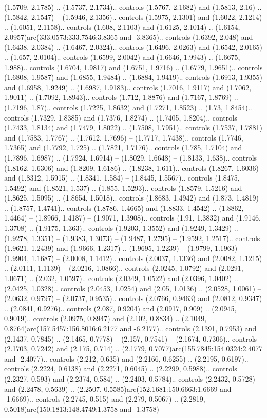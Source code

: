 (1.5709, 2.1785) .. (1.5737, 2.1734).. controls (1.5767, 2.1682) and (1.5813, 2.16) .. (1.5842, 2.1547) -- (1.5946, 2.1356).. controls (1.5975, 2.1301) and (1.6022, 2.1214) .. (1.6051, 2.1158).. controls (1.608, 2.1103) and (1.6125, 2.1014) .. (1.6154, 2.0957)arc(333.0573:333.7546:3.8365 and -3.8365).. controls (1.6392, 2.048) and (1.6438, 2.0384) .. (1.6467, 2.0324).. controls (1.6496, 2.0263) and (1.6542, 2.0165) .. (1.657, 2.0104).. controls (1.6599, 2.0042) and (1.6646, 1.9943) .. (1.6675, 1.988).. controls (1.6704, 1.9817) and (1.6751, 1.9716) .. (1.6779, 1.9651).. controls (1.6808, 1.9587) and (1.6855, 1.9484) .. (1.6884, 1.9419).. controls (1.6913, 1.9355) and (1.6958, 1.9249) .. (1.6987, 1.9183).. controls (1.7016, 1.9117) and (1.7062, 1.9011) .. (1.7092, 1.8943).. controls (1.712, 1.8876) and (1.7167, 1.8769) .. (1.7196, 1.87).. controls (1.7225, 1.8632) and (1.7271, 1.8523) .. (1.73, 1.8454).. controls (1.7329, 1.8385) and (1.7376, 1.8274) .. (1.7405, 1.8204).. controls (1.7433, 1.8134) and (1.7479, 1.8022) .. (1.7508, 1.7951).. controls (1.7537, 1.7881) and (1.7583, 1.7767) .. (1.7612, 1.7696) -- (1.7717, 1.7438).. controls (1.7746, 1.7365) and (1.7792, 1.725) .. (1.7821, 1.7176).. controls (1.785, 1.7104) and (1.7896, 1.6987) .. (1.7924, 1.6914) -- (1.8029, 1.6648) -- (1.8133, 1.638).. controls (1.8162, 1.6306) and (1.8209, 1.6186) .. (1.8238, 1.611).. controls (1.8267, 1.6036) and (1.8312, 1.5915) .. (1.8341, 1.584) -- (1.8445, 1.5567).. controls (1.8475, 1.5492) and (1.8521, 1.537) .. (1.855, 1.5293).. controls (1.8579, 1.5216) and (1.8625, 1.5095) .. (1.8654, 1.5018).. controls (1.8683, 1.4942) and (1.873, 1.4819) .. (1.8757, 1.4741).. controls (1.8786, 1.4665) and (1.8833, 1.4542) .. (1.8862, 1.4464) -- (1.8966, 1.4187) -- (1.9071, 1.3908).. controls (1.91, 1.3832) and (1.9146, 1.3708) .. (1.9175, 1.363).. controls (1.9203, 1.3552) and (1.9249, 1.3429) .. (1.9278, 1.3351) -- (1.9383, 1.3073) -- (1.9487, 1.2795) -- (1.9592, 1.2517).. controls (1.9621, 1.2439) and (1.9666, 1.2317) .. (1.9695, 1.2239) -- (1.9799, 1.1963) -- (1.9904, 1.1687) -- (2.0008, 1.1412).. controls (2.0037, 1.1336) and (2.0082, 1.1215) .. (2.0111, 1.1139) -- (2.0216, 1.0866).. controls (2.0245, 1.0792) and (2.0291, 1.0671) .. (2.032, 1.0597).. controls (2.0349, 1.0522) and (2.0396, 1.0402) .. (2.0425, 1.0328).. controls (2.0453, 1.0254) and (2.05, 1.0136) .. (2.0528, 1.0061) -- (2.0632, 0.9797) -- (2.0737, 0.9535).. controls (2.0766, 0.9463) and (2.0812, 0.9347) .. (2.0841, 0.9276).. controls (2.087, 0.9204) and (2.0917, 0.909) .. (2.0945, 0.9019).. controls (2.0975, 0.8947) and (2.102, 0.8834) .. (2.1049, 0.8764)arc(157.5457:156.8016:6.2177 and -6.2177).. controls (2.1391, 0.7953) and (2.1437, 0.7845) .. (2.1465, 0.7778) -- (2.157, 0.7541) -- (2.1674, 0.7306).. controls (2.1703, 0.7242) and (2.175, 0.714) .. (2.1779, 0.7077)arc(155.7845:154.0324:2.4077 and -2.4077).. controls (2.212, 0.635) and (2.2166, 0.6255) .. (2.2195, 0.6197).. controls (2.2224, 0.6138) and (2.2271, 0.6045) .. (2.2299, 0.5988).. controls (2.2327, 0.593) and (2.2374, 0.584) .. (2.2403, 0.5784).. controls (2.2432, 0.5728) and (2.2478, 0.5639) .. (2.2507, 0.5585)arc(152.1681:150.6663:1.6669 and -1.6669).. controls (2.2745, 0.515) and (2.279, 0.5067) .. (2.2819, 0.5018)arc(150.1813:148.4749:1.3758 and -1.3758) -- 